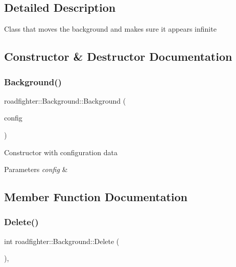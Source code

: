 \subsection{Detailed Description}
Class that moves the background and makes sure it appears infinite 

\subsection{Constructor \& Destructor Documentation}
\mbox{\label{classroadfighter_1_1Background_a7b01984ecdbd0ec7e2d2d9962463f663}} 
\subsubsection{\texorpdfstring{Background()}{Background()}}
{\footnotesize\ttfamily roadfighter\+::\+Background\+::\+Background (\begin{DoxyParamCaption}\item[{std\+::shared\+\_\+ptr$<$ \hyperlink{classConfigData}{Config\+Data} $>$}]{config }\end{DoxyParamCaption})}

Constructor with configuration data 
\begin{DoxyParams}{Parameters}
{\em config} & \\
\hline
\end{DoxyParams}


\subsection{Member Function Documentation}
\mbox{\label{classroadfighter_1_1Background_a6541d509079dfa940d9f7ec2ab706963}} 
\subsubsection{\texorpdfstring{Delete()}{Delete()}}
{\footnotesize\ttfamily int roadfighter\+::\+Background\+::\+Delete (\begin{DoxyParamCaption}{ }\end{DoxyParamCaption})\hspace{0.3cm}{\ttfamily [override]}, {\ttfamily [virtual]}}

